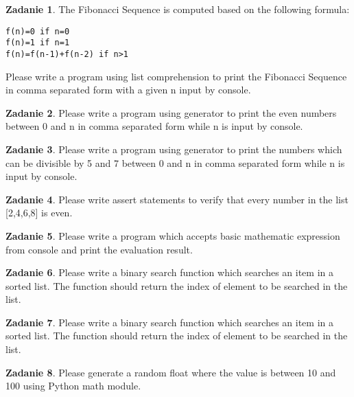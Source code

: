\documentclass[11pt]{article}
\theoremstyle{definition}
\newtheorem{zadanie}{Zadanie}
\begin{document}
\begin{zadanie}
The Fibonacci Sequence is computed based on the following formula:
\begin{verbatim}
f(n)=0 if n=0
f(n)=1 if n=1
f(n)=f(n-1)+f(n-2) if n>1
\end{verbatim}
Please write a program using list comprehension to print the Fibonacci Sequence in comma separated form with a given n input by console.

\end{zadanie}

\begin{zadanie}
Please write a program using generator to print the even numbers between 0 and n in comma separated form while n is input by console.

\end{zadanie}

\begin{zadanie}
Please write a program using generator to print the numbers which can be divisible by 5 and 7 between 0 and n in comma separated form while n is input by console.

\end{zadanie}

\begin{zadanie}
Please write assert statements to verify that every number in the list [2,4,6,8] is even.

\end{zadanie}

\begin{zadanie}
Please write a program which accepts basic mathematic expression from console and print the evaluation result.

\end{zadanie}

\begin{zadanie}
Please write a binary search function which searches an item in a sorted list. The function should return the index of element to be searched in the list.

\end{zadanie}

\begin{zadanie}
Please write a binary search function which searches an item in a sorted list. The function should return the index of element to be searched in the list.

\end{zadanie}

\begin{zadanie}
Please generate a random float where the value is between 10 and 100 using Python math module.

\end{zadanie}
\end{document}
